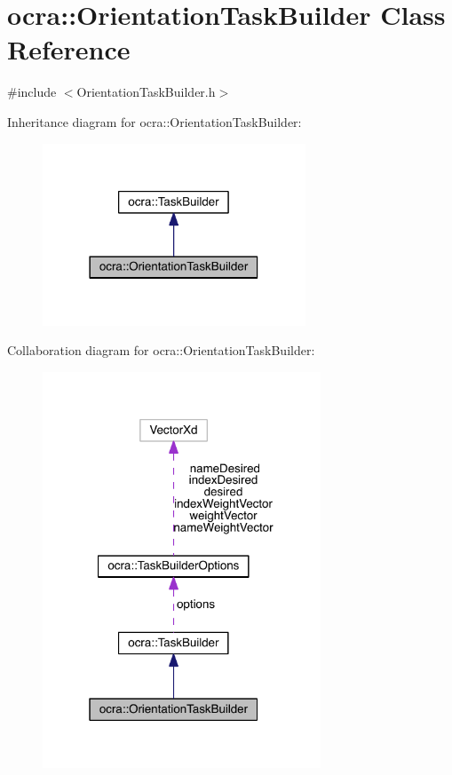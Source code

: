 \hypertarget{classocra_1_1OrientationTaskBuilder}{}\section{ocra\+:\+:Orientation\+Task\+Builder Class Reference}
\label{classocra_1_1OrientationTaskBuilder}


{\ttfamily \#include $<$Orientation\+Task\+Builder.\+h$>$}



Inheritance diagram for ocra\+:\+:Orientation\+Task\+Builder\+:\nopagebreak
\begin{figure}[H]
\begin{center}
\leavevmode
\includegraphics[width=222pt]{de/d80/classocra_1_1OrientationTaskBuilder__inherit__graph}
\end{center}
\end{figure}


Collaboration diagram for ocra\+:\+:Orientation\+Task\+Builder\+:\nopagebreak
\begin{figure}[H]
\begin{center}
\leavevmode
\includegraphics[width=235pt]{d8/d6e/classocra_1_1OrientationTaskBuilder__coll__graph}
\end{center}
\end{figure}
